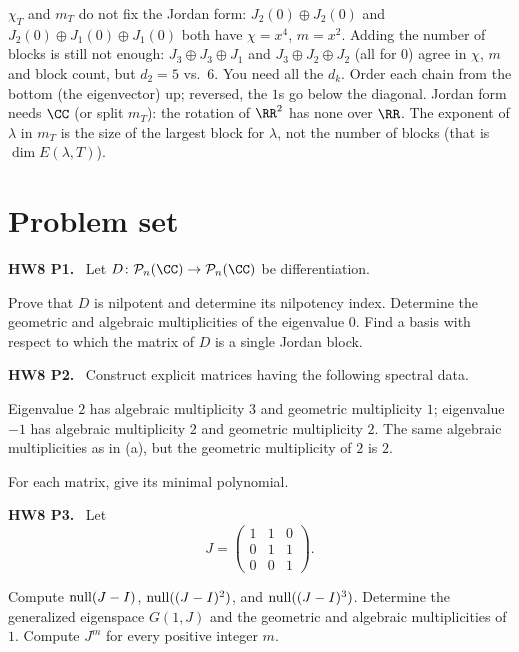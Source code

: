 \documentclass[10pt]{scrartcl}
\begin{document}
\begin{trapbox}
  \ii $\chi_T$ and $m_T$ do not fix the Jordan form: $J_2(0)\oplus J_2(0)$ and $J_2(0)\oplus J_1(0)\oplus J_1(0)$ both have $\chi=x^4$, $m=x^2$.
  \ii Adding the number of blocks is still not enough: $J_3\oplus J_3\oplus J_1$ and $J_3\oplus J_2\oplus J_2$ (all for $0$) agree in $\chi$, $m$ and block count, but $d_2=5$ vs.\ $6$. You need all the $d_k$.
  \ii Order each chain from the bottom (the eigenvector) up; reversed, the $1$s go below the diagonal.
  \ii Jordan form needs $\CC$ (or split $m_T$): the rotation of $\RR^2$ has none over $\RR$.
  \ii The exponent of $\lambda$ in $m_T$ is the size of the largest block for $\lambda$, not the number of blocks (that is $\dim E(\lambda,T)$).
\end{trapbox}



\section{Problem set}

\begin{prob}
\textbf{HW8 P1. }\ Let $D\colon\PP_n(\CC)\to\PP_n(\CC)$ be differentiation.
\begin{enumerate}[(a)]
  \ii Prove that $D$ is nilpotent and determine its nilpotency index.
  \ii Determine the geometric and algebraic multiplicities of the eigenvalue $0$.
  \ii Find a basis with respect to which the matrix of $D$ is a single Jordan block.
\end{enumerate}
\end{prob}

\begin{prob}
\textbf{HW8 P2. }\ Construct explicit matrices having the following spectral data.
\begin{enumerate}[(a)]
  \ii Eigenvalue $2$ has algebraic multiplicity $3$ and geometric multiplicity $1$; eigenvalue $-1$ has algebraic multiplicity $2$ and geometric multiplicity $2$.
  \ii The same algebraic multiplicities as in (a), but the geometric multiplicity of $2$ is $2$.
\end{enumerate}
For each matrix, give its minimal polynomial.
\end{prob}

\begin{prob}
\textbf{HW8 P3. }\ Let
\[
  J=\begin{pmatrix}1&1&0\\0&1&1\\0&0&1\end{pmatrix}.
\]
\begin{enumerate}[(a)]
  \ii Compute $\operatorname{null}(J-I)$, $\operatorname{null}((J-I)^2)$, and $\operatorname{null}((J-I)^3)$.
  \ii Determine the generalized eigenspace $G(1,J)$ and the geometric and algebraic multiplicities of $1$.
  \ii Compute $J^m$ for every positive integer $m$.
\end{enumerate}
\end{prob}
\end{document}

